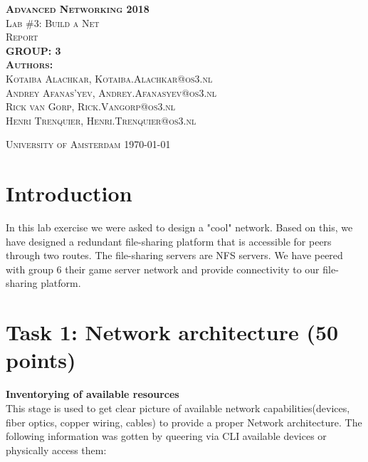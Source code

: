 \documentclass[10pt,a4paper]{article}
\begin{document}
\begin{titlepage}
\begin{center}
\textsc{\huge \bfseries Advanced Networking 2018}\\[1.5cm]
\textsc{\large Lab \#3: Build a Net}\\[1.5cm]
\textsc{\huge Report}\\[1.5cm]
\textsc{\huge \bfseries GROUP: 3}\\[1.5cm]
\textsc{\large{\textbf{Authors:}\\ 
Kotaiba Alachkar, Kotaiba.Alachkar@os3.nl\\ Andrey Afanas'yev, Andrey.Afanasyev@os3.nl\\
Rick van Gorp, Rick.Vangorp@os3.nl\\
Henri Trenquier, Henri.Trenquier@os3.nl
}}

\textsc{\large University of Amsterdam}
\today


\end{center}
\end{titlepage}


\tableofcontents

\newpage

\section{Introduction}
In this lab exercise we were asked to design a "cool" network. Based on this, we have designed a redundant file-sharing platform that is accessible for peers through two routes. The file-sharing servers are NFS servers. We have peered with group 6 their game server network and provide connectivity to our file-sharing platform.

\section{Task 1: Network architecture (50 points)}

\textbf{Inventorying of available resources}\\
This stage is used to get clear picture of available network capabilities(devices, fiber optics\cite{opticsmodules}\cite{cisco-opt-mods}, copper wiring, cables) to provide a proper Network architecture. The following information was gotten by queering via CLI available devices or physically access them:
\end{document}
